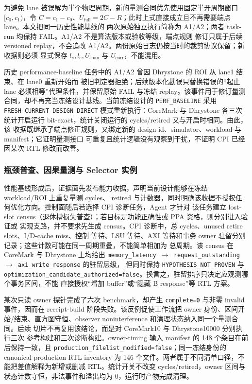 \documentclass[UTF8,a4paper,zihao=-4,oneside]{ctexart}
\newcommand{\statusword}[1]{\texttt{#1}}
\begin{document}
为避免 lane 被误解为半个物理周期，新的量测合同优先使用固定半开周期窗口 $[c_0,c_1)$，令
$C=c_1-c_0$、$U_{\mathrm{full}}=2C-R$；此时上式直接成立且不再需要端点 lane。本文把同一历史性能基线的
两次原始独立执行简称为 A1/A2；两者 task-run 均保持 FAIL。A1/A2 不是算法版本或验收等级，端点规则
修订只属于后续 versioned replay，不会追改 A1/A2。两份原始日志仍按当时的裁剪协议保留；新收据则必须
显式保存 $l_s,l_e,U_{\mathrm{span}}$ 与 $U_{\mathrm{corr}}$，不能混用。

历史 performance-baseline 任务中的 A1/A2 曾因 Dhrystone 的 ROI 从 lane1 结束、在 lane0 重新开始而
被旧判定器拒绝；后续版本化勘误只替换错误的“起止 lane 必须相等”代理条件，并保留原始 FAIL 与冻结
replay。该事件用于修订量测合同，却不再充当冻结设计基线。当前冻结设计的
\statusword{PERF\_BASELINE} 采用 \texttt{FRESH\_CURRENT\_DESIGN\_DIRECT} 模式重新执行：CoreMark 与
Dhrystone 各三次统计开启运行 bit-exact，统计关闭运行的 cycles/retired 又与开启时相同。由此，该
收据既继承了端点修正规则，又绑定新的 design-id、simulator、workload 与 manifest；它证明量测接口
可重复且统计逻辑没有观察到干扰，不证明 CPI 已经因某次 RTL 修改而改善。

\subsubsection{瓶颈普查、因果量测与 Selector 实例}

性能基线形成后，证据面先发布能力收据，声明当前设计能够在冻结 workload/ROI 上重复量测 cycles、
retired 与计数器，同时明确该收据不授权任何优化方向。控制面随后若选择 CPI 诊断任务，Agent 才针对
该任务建立 lost-slot census（退休槽损失普查）；若目标是功能正确性或 PPA 资格，则分别进入验证或
实现支路，并不要求先生成 census。CPI 诊断中，总 cycles、unused retire slots、I/D-cache miss、控制
等待、LSU 等待、AXI 等待和事务 owner 驻留分别记录；这些计数可能在同一周期重叠，不能简单相加为
总周期。该 census 在 CoreMark 与 Dhrystone 上均给出
\texttt{memory\_latency $\rightarrow$ request\_outstanding $\rightarrow$ axi\_write\_response} 的驻留层级，
但同时保持 \texttt{HYPOTHESIS\_NOT\_PROVEN} 与
\texttt{optimization\_candidate\_authorized=false}。换言之，驻留排序只决定应观测哪个事务区间，不能
直接授权“增加 buffer”或“隐藏 B response”等 RTL 方案。

某次只读 owner 探针完成了六次 benchmark，却产生
\texttt{complete=0} 与非零 invalid 事件，因而在 receipt-build 阶段失败。该反例促使工作流把 owner
身份、区间开始/结束、直方图守恒、observer noninterference 和清理状态纳入同一个量测合同。后续
切片不再复用该结论，而是对 CoreMark10 与 Dhrystone10000 分别执行三次
参考构建和三次诊断构建。owner-timing 输入 manifest 的 148 个条目在前后保持一致，且
\texttt{production\_filelist\_modified=false}；同一冻结身份的 canonical production RTL inventory 为
146 个文件。两者属于不同清单口径，不能把差值解释为新增或删减 RTL。统计开关不改变
cycles/retired，owner 区间与状态计数守恒，非法事件和溢出均为 0，运行时产物完成清理。
\end{document}
